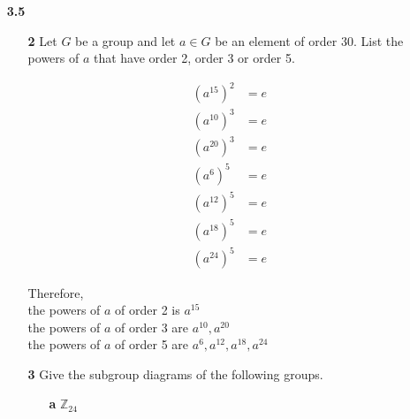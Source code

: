 \documentclass[paper=usletter, fontsize=12pt]{article}
\begin{document}
\begin{itemize}
\begin{itemize}
\begin{cproof}
            \end{cproof}

        \end{itemize}

        \item[\textbf{3.5}]

        \begin{itemize}

            \item[\textbf{2}] Let $G$ be a group and let $a \in G$ be an
            element of order 30. List the powers of $a$ that have order 2,
            order 3 or order 5.
            \begin{cproof}

                \begin{align*}
                    (a^{15})^{2} & = e
                \end{align*}
                \begin{align*}
                    (a^{10})^{3} & = e \\
                    (a^{20})^{3} & = e
                \end{align*}
                \begin{align*}
                    (a^{6})^{5} & = e \\
                    (a^{12})^{5} & = e \\
                    (a^{18})^{5} & = e \\
                    (a^{24})^{5} & = e
                \end{align*}

                Therefore,\\
                the powers of $a$ of order 2 is $a^{15}$\\
                the powers of $a$ of order 3 are $a^{10},a^{20}$\\
                the powers of $a$ of order 5 are $a^{6},a^{12},a^{18},a^{24}$ \qedhere

            \end{cproof}

            \item[\textbf{3}] Give the subgroup diagrams of the following
            groups.
            \begin{enumerate}

                \item[\textbf{a}] $\mathbb{Z}_{24}$
                \begin{cproof}


\end{cproof}
\end{enumerate}
\end{itemize}
\end{itemize}
\end{document}
